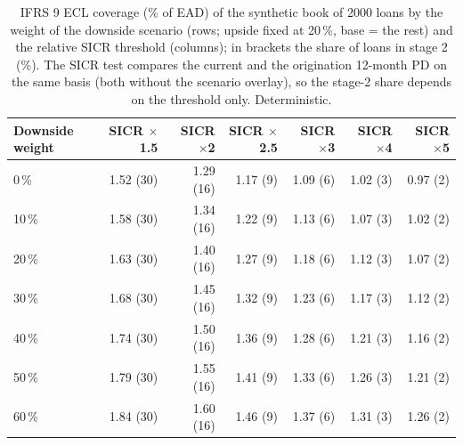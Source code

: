 \begin{table}[H]
\centering
\scriptsize
\caption{IFRS 9 ECL coverage (\% of EAD) of the synthetic book of 2000 loans by the weight of the downside scenario (rows; upside fixed at 20\,\%, base = the rest) and the relative SICR threshold (columns); in brackets the share of loans in stage 2 (\%). The SICR test compares the current and the origination 12-month PD on the same basis (both without the scenario overlay), so the stage-2 share depends on the threshold only. Deterministic.}
\label{tab:C3_ecl}
\setlength{\tabcolsep}{4pt}
\begin{tabular}{lrrrrrr}
\toprule
Downside weight & SICR $\times$1.5 & SICR $\times$2 & SICR $\times$2.5 & SICR $\times$3 & SICR $\times$4 & SICR $\times$5 \\
\midrule
0\,\% & 1.52 (30) & 1.29 (16) & 1.17 (9) & 1.09 (6) & 1.02 (3) & 0.97 (2) \\
10\,\% & 1.58 (30) & 1.34 (16) & 1.22 (9) & 1.13 (6) & 1.07 (3) & 1.02 (2) \\
20\,\% & 1.63 (30) & 1.40 (16) & 1.27 (9) & 1.18 (6) & 1.12 (3) & 1.07 (2) \\
30\,\% & 1.68 (30) & 1.45 (16) & 1.32 (9) & 1.23 (6) & 1.17 (3) & 1.12 (2) \\
40\,\% & 1.74 (30) & 1.50 (16) & 1.36 (9) & 1.28 (6) & 1.21 (3) & 1.16 (2) \\
50\,\% & 1.79 (30) & 1.55 (16) & 1.41 (9) & 1.33 (6) & 1.26 (3) & 1.21 (2) \\
60\,\% & 1.84 (30) & 1.60 (16) & 1.46 (9) & 1.37 (6) & 1.31 (3) & 1.26 (2) \\
\bottomrule
\end{tabular}
\end{table}
